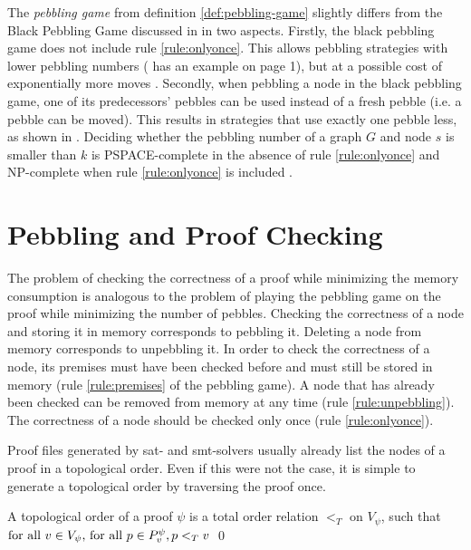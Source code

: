 \documentclass{llncs}
\newcommand{\Vertices}[1]{V_{#1}}
\newcommand{\Premises}[2]{P_{#1}^{#2}}
\begin{document}
\noindent
The \emph{pebbling game} from definition \ref{def:pebbling-game} slightly differs from the Black Pebbling Game discussed in \cite{hertel2007black,pippenger1982advances} in two aspects. Firstly, the black pebbling game  does not include rule \ref{rule:onlyonce}. This allows pebbling strategies with lower pebbling numbers (\cite{sethi1975complete} has an example on page 1), but at a possible cost of exponentially more moves \cite{van1979move}. Secondly, when pebbling a node in the black pebbling game, one of its predecessors' pebbles can be used instead of a fresh pebble (i.e. a pebble can be moved). This results in strategies that use exactly one pebble less, as shown in \cite{van1979move}.
Deciding whether the pebbling number of a graph $G$ and node $s$ is smaller than $k$ is PSPACE-complete in the absence of rule \ref{rule:onlyonce} \cite{gilbert1980pebbling} and NP-complete when rule \ref{rule:onlyonce} is included \cite{sethi1975complete}.



\section{Pebbling and Proof Checking}
\label{sec:pebblingchecking}

The problem of checking the correctness of a proof while minimizing the memory consumption is analogous to the problem of playing the pebbling game on the proof while minimizing the number of pebbles. Checking the correctness of a node and storing it in memory corresponds to pebbling it. Deleting a node from memory corresponds to unpebbling it. In order to check the correctness of a node, its premises must have been checked before and must still be stored in memory (rule \ref{rule:premises} of the pebbling game). A node that has already been checked can be removed from memory at any time (rule \ref{rule:unpebbling}). The correctness of a node should be checked only once (rule \ref{rule:onlyonce}).

Proof files generated by sat- and smt-solvers usually already list the nodes of a proof in a topological order. Even if this were not the case, it is simple to generate a topological order by traversing the proof once.

\begin{definition}
\label{def:topological-order}
A topological order of a proof $\psi$ is a total order relation $<_T$ on $\Vertices{\psi}$, such that 
$
\text{for all } \n \in \Vertices{\psi} \text{, for all } p \in \Premises{\n}{\psi},
p <_T v
$
\qed
\end{definition}
\end{document}
